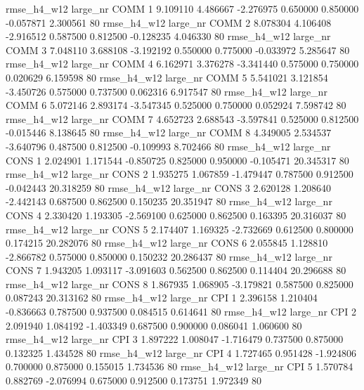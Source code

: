  rmse_h4_w12   large_nr     COMM                 1  9.109110  4.486667  -2.276975 0.650000 0.850000 -0.057871    2.300561 80
 rmse_h4_w12   large_nr     COMM                 2  8.078304  4.106408  -2.916512 0.587500 0.812500 -0.128235    4.046330 80
 rmse_h4_w12   large_nr     COMM                 3  7.048110  3.688108  -3.192192 0.550000 0.775000 -0.033972    5.285647 80
 rmse_h4_w12   large_nr     COMM                 4  6.162971  3.376278  -3.341440 0.575000 0.750000  0.020629    6.159598 80
 rmse_h4_w12   large_nr     COMM                 5  5.541021  3.121854  -3.450726 0.575000 0.737500  0.062316    6.917547 80
 rmse_h4_w12   large_nr     COMM                 6  5.072146  2.893174  -3.547345 0.525000 0.750000  0.052924    7.598742 80
 rmse_h4_w12   large_nr     COMM                 7  4.652723  2.688543  -3.597841 0.525000 0.812500 -0.015446    8.138645 80
 rmse_h4_w12   large_nr     COMM                 8  4.349005  2.534537  -3.640796 0.487500 0.812500 -0.109993    8.702466 80
 rmse_h4_w12   large_nr     CONS                 1  2.024901  1.171544  -0.850725 0.825000 0.950000 -0.105471   20.345317 80
 rmse_h4_w12   large_nr     CONS                 2  1.935275  1.067859  -1.479447 0.787500 0.912500 -0.042443   20.318259 80
 rmse_h4_w12   large_nr     CONS                 3  2.620128  1.208640  -2.442143 0.687500 0.862500  0.150235   20.351947 80
 rmse_h4_w12   large_nr     CONS                 4  2.330420  1.193305  -2.569100 0.625000 0.862500  0.163395   20.316037 80
 rmse_h4_w12   large_nr     CONS                 5  2.174407  1.169325  -2.732669 0.612500 0.800000  0.174215   20.282076 80
 rmse_h4_w12   large_nr     CONS                 6  2.055845  1.128810  -2.866782 0.575000 0.850000  0.150232   20.286437 80
 rmse_h4_w12   large_nr     CONS                 7  1.943205  1.093117  -3.091603 0.562500 0.862500  0.114404   20.296688 80
 rmse_h4_w12   large_nr     CONS                 8  1.867935  1.068905  -3.179821 0.587500 0.825000  0.087243   20.313162 80
 rmse_h4_w12   large_nr      CPI                 1  2.396158  1.210404  -0.836663 0.787500 0.937500  0.084515    0.614641 80
 rmse_h4_w12   large_nr      CPI                 2  2.091940  1.084192  -1.403349 0.687500 0.900000  0.086041    1.060600 80
 rmse_h4_w12   large_nr      CPI                 3  1.897222  1.008047  -1.716479 0.737500 0.875000  0.132325    1.434528 80
 rmse_h4_w12   large_nr      CPI                 4  1.727465  0.951428  -1.924806 0.700000 0.875000  0.155015    1.734536 80
 rmse_h4_w12   large_nr      CPI                 5  1.570784  0.882769  -2.076994 0.675000 0.912500  0.173751    1.972349 80

